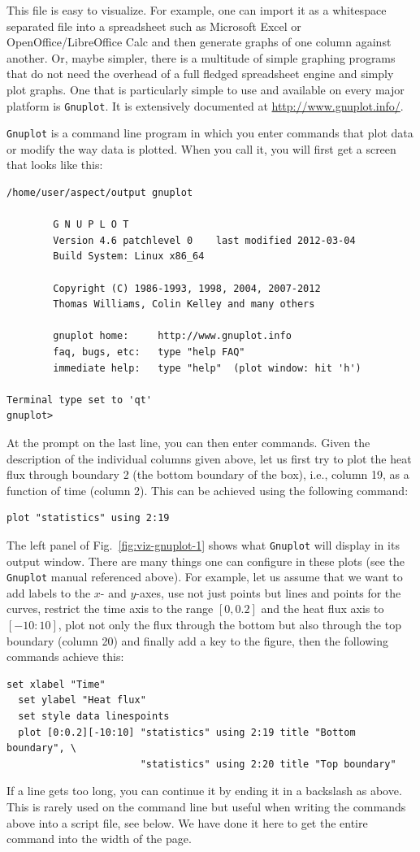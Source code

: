 \documentclass{article}
\begin{document}
This file is easy to visualize. For example, one can import it as a whitespace
separated file into a spreadsheet such as Microsoft Excel or OpenOffice/LibreOffice
Calc and then generate graphs of one column against another. Or, maybe simpler,
there is a multitude of simple graphing programs that do not need the overhead
of a full fledged spreadsheet engine and simply plot graphs. One that is
particularly simple to use and available on every major platform is \texttt{Gnuplot}.
It is extensively documented at \url{http://www.gnuplot.info/}.

\texttt{Gnuplot} is a command line program in which you enter commands that
plot data or modify the way data is plotted. When you call it, you will first
get a screen that looks like this:
\begin{lstlisting}[frame=single,showstringspaces=false]
/home/user/aspect/output gnuplot

        G N U P L O T
        Version 4.6 patchlevel 0    last modified 2012-03-04
        Build System: Linux x86_64

        Copyright (C) 1986-1993, 1998, 2004, 2007-2012
        Thomas Williams, Colin Kelley and many others

        gnuplot home:     http://www.gnuplot.info
        faq, bugs, etc:   type "help FAQ"
        immediate help:   type "help"  (plot window: hit 'h')

Terminal type set to 'qt'
gnuplot>
\end{lstlisting}
At the prompt on the last line, you can then enter commands. Given the
description of the individual columns given above, let us first try to
plot the heat flux through boundary 2 (the bottom
boundary of the box), i.e., column 19, as a function of time (column 2).
This can be achieved using the following command:
\begin{lstlisting}[frame=single,language=gnuplot,showstringspaces=false]
  plot "statistics" using 2:19
\end{lstlisting}
The left panel of Fig.~\ref{fig:viz-gnuplot-1} shows what \texttt{Gnuplot}
will display in its output window. There are many things one can
configure in these plots (see the \texttt{Gnuplot} manual referenced above).
For example, let us assume that we want to add labels to the $x$- and $y$-axes,
use not just points but lines and points for the curves,
restrict the time axis to the range $[0,0.2]$ and the heat flux axis to
$[-10:10]$,
plot not only the flux through the bottom but also through the top boundary
(column 20) and finally add a key to the figure, then the following
commands achieve this:
\begin{lstlisting}[frame=single,language=gnuplot,showstringspaces=false]
  set xlabel "Time"
  set ylabel "Heat flux"
  set style data linespoints
  plot [0:0.2][-10:10] "statistics" using 2:19 title "Bottom boundary", \
                       "statistics" using 2:20 title "Top boundary"
\end{lstlisting}
If a line gets too long, you can continue it by ending it in a backslash as
above. This is rarely used on the command line but useful when writing the
commands above into a script file, see below. We have done it here to get
the entire command into the width of the page.
\end{document}
